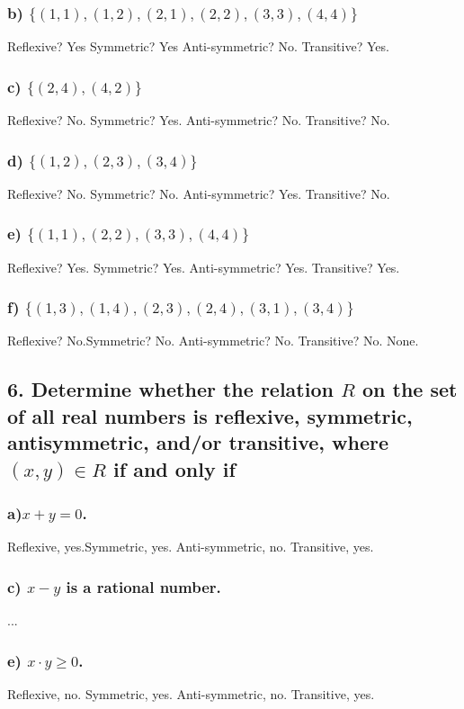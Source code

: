 \documentclass[11pt, oneside]{article} %
\numberwithin{equation}{section} %
\numberwithin{figure}{section} %
\numberwithin{table}{section} %
\begin{document}
\subsubsection{b) $\{(1, 1), (1, 2), (2, 1), (2, 2), (3, 3), (4, 4)\}$}
Reflexive? Yes Symmetric? Yes Anti-symmetric? No. Transitive? Yes.
\subsubsection{c) $\{(2, 4), (4, 2)\}$}
Reflexive? No. Symmetric? Yes. Anti-symmetric? No. Transitive? No.
\subsubsection{d) $\{(1, 2), (2, 3), (3, 4)\}$}
Reflexive? No. Symmetric? No. Anti-symmetric? Yes. Transitive? No.
\subsubsection{e) $\{(1, 1), (2, 2), (3, 3), (4, 4)\}$}
Reflexive? Yes. Symmetric? Yes. Anti-symmetric? Yes. Transitive? Yes.
\subsubsection{f) $\{(1, 3), (1, 4), (2, 3), (2, 4), (3, 1), (3, 4)\}$}
Reflexive? No.Symmetric? No. Anti-symmetric? No. Transitive? No. None.

\subsection{6. Determine whether the relation $R$ on the set of all real numbers is reflexive, symmetric, antisymmetric, and/or transitive, where $(x , y ) ∈ R$ if and only if}
\subsubsection{a)$x+y=0$.}
Reflexive, yes.Symmetric, yes. Anti-symmetric, no. Transitive, yes.
\subsubsection{c) $x−y$ is a rational number.}
...
\subsubsection{e) $x\cdot y\geq 0$.}
Reflexive, no. Symmetric, yes. Anti-symmetric, no. Transitive, yes.
\end{document}
